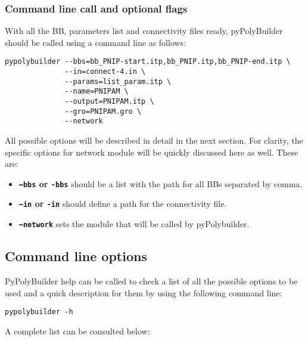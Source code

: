 \documentclass[12pt]{article}
\begin{document}
\subsubsection{Command line call and optional flags}
With all the BB, parameters list and connectivity files ready, pyPolyBuilder should be called using a command line as follows:

\begin{lstlisting}
pypolybuilder --bbs=bb_PNIP-start.itp,bb_PNIP.itp,bb_PNIP-end.itp \
              --in=connect-4.in \
              --params=list_param.itp \
              --name=PNIPAM \
              --output=PNIPAM.itp \
              --gro=PNIPAM.gro \
              --network
\end{lstlisting}

All possible options will be described in detail in the next section.
For clarity, the specific options for network module will be quickly discussed here as well.
These are:
\begin{itemize}
    \item \textbf{\texttt{--bbs} or \texttt{-bbs}} should be a list with the path for all BBs separated by comma.
    
    \item \textbf{\texttt{--in} or \texttt{-in}} should define a path for the connectivity file.
    
    \item \textbf{\texttt{--network}} sets the module that will be called by pyPolybuilder.
\end{itemize}

\subsection{Command line options}
\label{sec:CommandLine}

PyPolyBuilder help can be called to check a list of all the possible options to be used and a quick description for them by using the following command line:

\begin{lstlisting}
pypolybuilder -h
\end{lstlisting}

A complete list can be consulted below:
\end{document}
